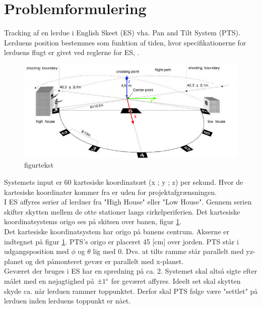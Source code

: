\section{Problemformulering}
Tracking af en lerdue i English Skeet (ES) vha. Pan and Tilt System (PTS). 
Lerduens position bestemmes som funktion af tiden, hvor specifikationerne for lerduens flugt er givet ved reglerne for ES, \citep{ES_regler}.

\begin{figure}[th!]
\centering
\includegraphics[width=1\textwidth]{./graphics/skeet_diagram_cropped_axes}
\caption[tekst i indholdsfortegnelsen]{figurtekst}
\label{fig:ES}
\end{figure}	
Systemets input er 60 kartesiske koordinatsæt (x ; y ; z) per sekund.
Hvor de kartesiske koordinater kommer fra er uden for projektafgrænsningen. \\

I ES affyres serier af lerduer fra "High House" eller "Low House".
Gennem serien skifter skytten mellem de otte stationer langs cirkelperiferien.
Det kartesiske koordinatsystems origo ses på skitsen over banen, figur \ref{fig:ES}.\\

Det kartesiske koordinatsystem har origo på banens centrum.
Akserne er indtegnet på figur \ref{fig:ES}. PTS's origo er placeret 45 [cm] over jorden.
PTS står i udgangsposition med \(\phi\) og \(\theta\) lig med 0.
Dvs. at tilts ramme står parallelt med yz-planet og det påmonteret gevær er parallelt med x-planet.\\

Geværet der bruges i ES har en spredning på ca. 2\degree.
Systemet skal altså sigte efter målet med en nøjagtighed på \(\pm 1 \degree\) før geværet affyres.
Ideelt set skal skytten skyde ca. når lerduen rammer toppunktet.
Derfor skal PTS følge være "settlet" på lerduen inden lerduens toppunkt er nået.\\

